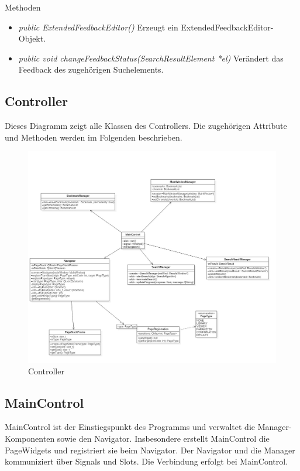 Methoden
\begin{itemize}
	\item\textit{public ExtendedFeedbackEditor()}
	Erzeugt ein ExtendedFeedbackEditor-Objekt.
	\item\textit{public void changeFeedbackStatus(SearchResultElement *el)}
	Verändert das Feedback des zugehörigen Suchelements.
\end{itemize}

\pagebreak

\subsection{Controller}

Dieses Diagramm zeigt alle Klassen des Controllers. Die zugehörigen Attribute und Methoden werden im Folgenden beschrieben.

\begin{figure}[H]
\includegraphics[width=1\linewidth]{img/Klassendiagramm/Controller}
\caption{Controller}
\label{fig:controller}
\end{figure}

\pagebreak

\subsection*{MainControl}
MainControl ist der Einstiegspunkt des Programms und verwaltet die Manager-Komponenten sowie den Navigator. Insbesondere erstellt MainControl die PageWidgets und registriert sie beim Navigator.
Der Navigator und die Manager kommuniziert über Signals und Slots. Die Verbindung erfolgt bei MainControl.

